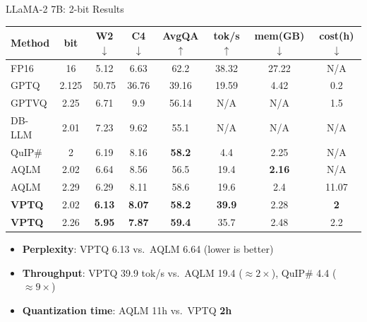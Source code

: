 \begin{frame}{LLaMA-2 7B: 2-bit Results}
  \begin{center}
  \scriptsize
  \begin{tabular}{lccccccc}
    \toprule
    Method & bit & W2$\downarrow$ & C4$\downarrow$ & AvgQA$\uparrow$ & tok/s$\uparrow$ & mem(GB)$\downarrow$ & cost(h)$\downarrow$ \\
    \midrule
    FP16    & 16    & 5.12  & 6.63  & 62.2          & 38.32         & 27.22         & N/A  \\
    GPTQ    & 2.125 & 50.75 & 36.76 & 39.16         & 19.59         & 4.42          & 0.2  \\
    GPTVQ   & 2.25  & 6.71  & 9.9   & 56.14         & N/A           & N/A           & 1.5  \\
    DB-LLM  & 2.01  & 7.23  & 9.62  & 55.1          & N/A           & N/A           & N/A  \\
    QuIP\#  & 2     & 6.19  & 8.16  & \textbf{58.2} & 4.4           & 2.25          & N/A  \\
    AQLM    & 2.02  & 6.64  & 8.56  & 56.5          & 19.4          & \textbf{2.16} & N/A  \\
    AQLM    & 2.29  & 6.29  & 8.11  & 58.6          & 19.6          & 2.4           & 11.07 \\
    \midrule
    \rowcolor{mycolor!15}
    \textbf{VPTQ} & 2.02 & \textbf{6.13} & \textbf{8.07} & \textbf{58.2} & \textbf{39.9} & 2.28 & \textbf{2} \\
    \rowcolor{mycolor!10}
    \textbf{VPTQ} & 2.26 & \textbf{5.95} & \textbf{7.87} & \textbf{59.4} & 35.7          & 2.48 & 2.2 \\
    \bottomrule
  \end{tabular}
  \end{center}
  \vspace{0.2em}
  \begin{itemize}
    \item \textbf{Perplexity}: VPTQ 6.13 vs.\ AQLM 6.64 (lower is better)
    \item \textbf{Throughput}: VPTQ 39.9 tok/s vs.\ AQLM 19.4 ($\approx 2\times$), QuIP\# 4.4 ($\approx 9\times$)
    \item \textbf{Quantization time}: AQLM 11h vs.\ VPTQ \textbf{2h}
  \end{itemize}
\end{frame}

